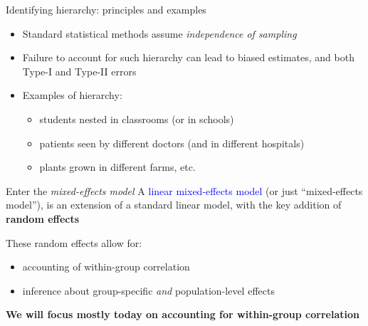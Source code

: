 \documentclass[
  ignorenonframetext,
  aspectratio=169,
]{beamer}
\providecommand{\tightlist}{%
  \setlength{\itemsep}{0pt}\setlength{\parskip}{0pt}}\usepackage{longtable,booktabs,array}
\begin{document}
\begin{frame}{Identifying hierarchy: principles and examples}
\label{identifying-hierarchy-principles-and-examples}
\begin{itemize}
\tightlist
\item
  Standard statistical methods assume \emph{independence of sampling}
\item
  Failure to account for such hierarchy can lead to biased estimates,
  and both Type-I and Type-II errors
\item
  Examples of hierarchy: \pause

  \begin{itemize}
  \tightlist
  \item
    students nested in classrooms (or in schools)
  \item
    patients seen by different doctors (and in different hospitals)
  \item
    plants grown in different farms, etc.
  \end{itemize}
\end{itemize}
\end{frame}

\begin{frame}{Enter the \emph{mixed-effects model}}
\label{enter-the-mixed-effects-model}
A \textcolor{blue}{linear mixed-effects model} (or just ``mixed-effects
model''), is an extension of a standard linear model, with the key
addition of \textbf{random effects}

These random effects allow for:

\begin{itemize}
\tightlist
\item
  accounting of within-group correlation
\item
  inference about group-specific \textit{and} population-level effects
\end{itemize}

\pause 
\vspace{5em}
\begin{center}
\textbf{We will focus mostly today on accounting for within-group correlation}
\end{center}
\end{frame}
\end{document}
